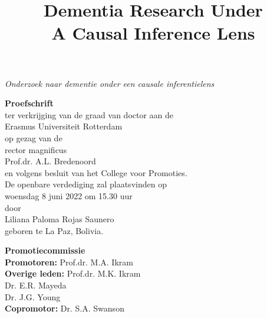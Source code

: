 \newpage
\thispagestyle{empty}
\begin{center}
\vspace{20mm}

\title{\textbf{\Large Dementia Research Under \\ \vspace{5mm} A Causal Inference Lens}}

\textit{\large Onderzoek naar dementie onder een causale inferentielens}

\vspace{10mm}
\textbf{\large{Proefschrift}}\\
\vspace{10mm}
ter verkrijging van de graad van doctor aan de\\
Erasmus Universiteit Rotterdam\\
op gezag van de\\
rector magnificus\\
\vspace{10mm}
Prof.dr. A.L. Bredenoord\\
\vspace{10mm}
en volgens besluit van het College voor Promoties.\\
De openbare verdediging zal plaatsvinden op\\
\vspace{10mm}
woensdag 8 juni 2022 om 15.30 uur\\
\vspace{10mm}
door\\
\vspace{10mm}
Liliana Paloma Rojas Saunero\\
geboren te La Paz, Bolivia. 
\end{center}


 

\newpage
\begin{flushleft}
\textbf{\large{Promotiecommissie}}\\
\vspace{10mm}
  \textbf{Promotoren:} \hspace{6mm} Prof.dr. M.A. Ikram \\
\vspace{10mm}
\textbf{Overige leden:} \hspace{3.5mm} Prof.dr. M.K. Ikram \\
\hspace{29mm} Dr. E.R. Mayeda \\
\hspace{29mm} Dr. J.G. Young\\
\vspace{10mm}
\textbf{Copromotor:} \hspace{6mm} Dr. S.A. Swanson\\
\end{flushleft}
\vspace*{\fill}



